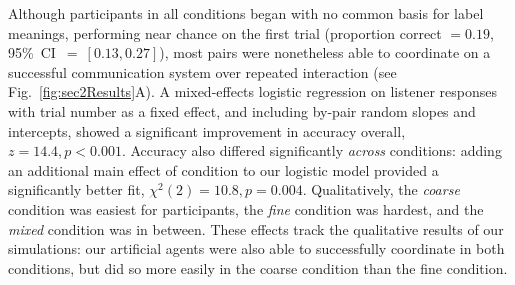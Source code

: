 Although participants in all conditions began with no common basis for label meanings, performing near chance on the first trial (proportion correct $= 0.19$, 95\%~CI~$=~[0.13, 0.27]$), most pairs were nonetheless able to coordinate on a successful communication system over repeated interaction (see Fig.\ \ref{fig:sec2Results}A). 
A mixed-effects logistic regression on listener responses with trial number as a fixed effect, and including by-pair random slopes and intercepts, showed a significant improvement in accuracy overall, $z = 14.4, p < 0.001$. 
Accuracy also differed significantly \emph{across} conditions: adding an additional main effect of condition to our logistic model provided a significantly better fit, $\chi^2(2) = 10.8, p = 0.004$. 
Qualitatively, the \emph{coarse} condition was easiest for participants, the \emph{fine} condition was hardest, and the \emph{mixed} condition was in between.
These effects track the qualitative results of our simulations: our artificial agents were also able to successfully coordinate in both conditions, but did so more easily in the coarse condition than the fine condition. 

